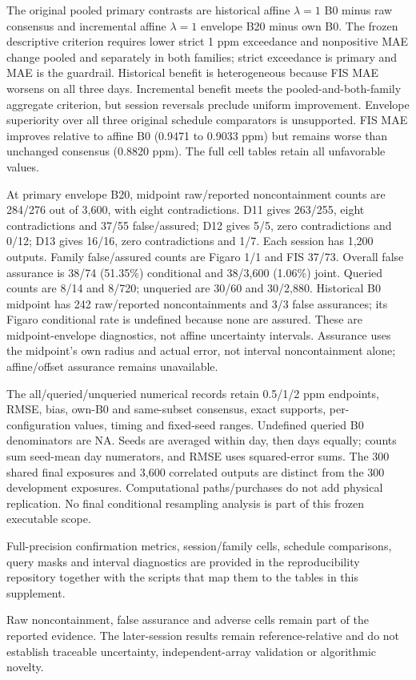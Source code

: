 \documentclass[11pt,a4paper]{article}
\begin{document}
The original pooled primary contrasts are historical affine $\lambda=1$ B0 minus raw consensus and incremental affine $\lambda=1$ envelope B20 minus own B0. The frozen descriptive criterion requires lower strict 1 ppm exceedance and nonpositive MAE change pooled and separately in both families; strict exceedance is primary and MAE is the guardrail. Historical benefit is heterogeneous because FIS MAE worsens on all three days. Incremental benefit meets the pooled-and-both-family aggregate criterion, but session reversals preclude uniform improvement. Envelope superiority over all three original schedule comparators is unsupported. FIS MAE improves relative to affine B0 (0.9471 to 0.9033 ppm) but remains worse than unchanged consensus (0.8820 ppm). The full cell tables retain all unfavorable values.





At primary envelope B20, midpoint raw/reported noncontainment counts are 284/276 out of 3,600, with eight contradictions. D11 gives 263/255, eight contradictions and 37/55 false/assured; D12 gives 5/5, zero contradictions and 0/12; D13 gives 16/16, zero contradictions and 1/7. Each session has 1,200 outputs. Family false/assured counts are Figaro 1/1 and FIS 37/73. Overall false assurance is 38/74 (51.35\%) conditional and 38/3,600 (1.06\%) joint. Queried counts are 8/14 and 8/720; unqueried are 30/60 and 30/2,880. Historical B0 midpoint has 242 raw/reported noncontainments and 3/3 false assurances; its Figaro conditional rate is undefined because none are assured. These are midpoint-envelope diagnostics, not affine uncertainty intervals. Assurance uses the midpoint's own radius and actual error, not interval noncontainment alone; affine/offset assurance remains unavailable.

The all/queried/unqueried numerical records retain 0.5/1/2 ppm endpoints, RMSE, bias, own-B0 and same-subset consensus, exact supports, per-configuration values, timing and fixed-seed ranges. Undefined queried B0 denominators are NA. Seeds are averaged within day, then days equally; counts sum seed-mean day numerators, and RMSE uses squared-error sums. The 300 shared final exposures and 3,600 correlated outputs are distinct from the 300 development exposures. Computational paths/purchases do not add physical replication. No final conditional resampling analysis is part of this frozen executable scope.



Full-precision confirmation metrics, session/family cells, schedule comparisons, query masks and interval diagnostics are provided in the reproducibility repository together with the scripts that map them to the tables in this supplement.

Raw noncontainment, false assurance and adverse cells remain part of the reported evidence. The later-session results remain reference-relative and do not establish traceable uncertainty, independent-array validation or algorithmic novelty.

\end{document}
